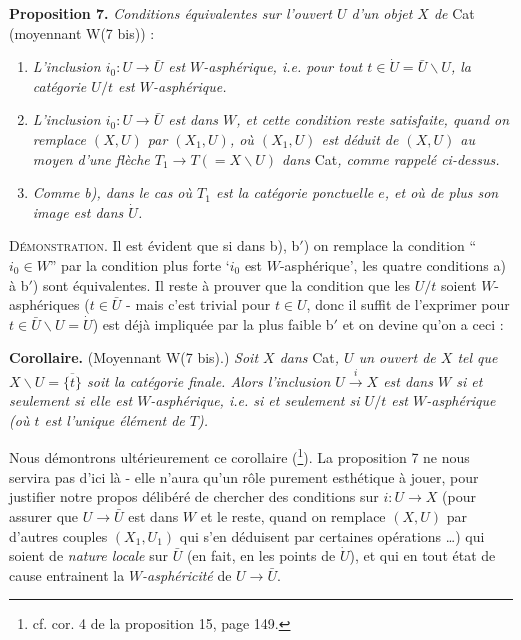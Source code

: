 \documentclass[11pt]{article}
\newcommand{\msp}[1]{\marginpar{\footnotesize [#1]}}
\begin{document}
\textbf{Proposition 7.} \textit{Conditions équivalentes sur l’ouvert $U$ d’un objet $X$ de} Cat (moyennant W(7 bis)) :

\begin{enumerate}[label={}, leftmargin=*]
\item[\textit{a)}] \textit{L’inclusion $i_0:U\longrightarrow\bar U$ est $W$-asphérique, i.e. pour tout $t\in\dot U=\bar U\backslash U$, la catégorie $U/t$ est $W$-asphérique.}
\item[\textit{b)}] \textit{L’inclusion $i_0:U\longrightarrow\bar U$ est dans $W$, et cette condition reste satisfaite, quand on remplace $(X,U)$ par $(X_1,U)$, où $(X_1,U)$ est déduit de $(X,U)$ au moyen d’une flèche $T_1\longrightarrow T(=X\backslash U)$ dans} Cat\textit{, comme rappelé ci-dessus.}
\item[\textit{b$'$)}] \textit{Comme b), dans le cas où $T_1$ est la catégorie ponctuelle $e$, et où de plus son image est dans $\dot U$.}
\end{enumerate}

\textsc{Démonstration}. Il est évident que si dans b), b$'$) on remplace la condition “$i_0\in W$” par la condition plus forte ‘$i_0$ est $W$-asphérique’, les quatre conditions a) à b$'$) sont équivalentes. Il reste à prouver que la condition que les $U/t$ soient $W$-asphériques ($t\in\bar U$ - mais c’est trivial pour $t\in U$, donc il suffit de l’exprimer pour $t\in\bar U\backslash U=\dot U$) est déjà impliquée par la plus faible b$'$ et on devine qu’on a ceci :

\msp{page 85}

\textbf{Corollaire.} (Moyennant W(7 bis).) \textit{Soit $X$ dans} Cat\textit{, $U$ un ouvert de $X$ tel que $X\backslash U=\overline{\{t\}}$ soit la catégorie finale. Alors l’inclusion $U\xrightarrow{i}X$ est dans $W$ si et seulement si elle est $W$-asphérique, i.e. si et seulement si $U/t$ est $W$-asphérique (où $t$ est l’unique élément de $T$).}

Nous démontrons ultérieurement ce corollaire (\footnote[65]{cf. cor. 4 de la proposition 15, page 149.}). La proposition 7 ne nous servira pas d’ici là - elle n’aura qu’un rôle purement esthétique à jouer, pour justifier notre propos délibéré de chercher des conditions sur $i:U\longrightarrow X$ (pour assurer que $U\longrightarrow\bar U$ est dans $W$ et le reste, quand on remplace $(X,U)$ par d’autres couples $(X_1,U_1)$ qui s’en déduisent par certaines opérations \dots) qui
\msp{page 86}
soient de \textit{nature locale} sur $\bar U$ (en fait, en les points de $\dot U$), et qui en tout état de cause entrainent la \textit{$W$-asphéricité} de $U\longrightarrow\bar U$.
\end{document}

